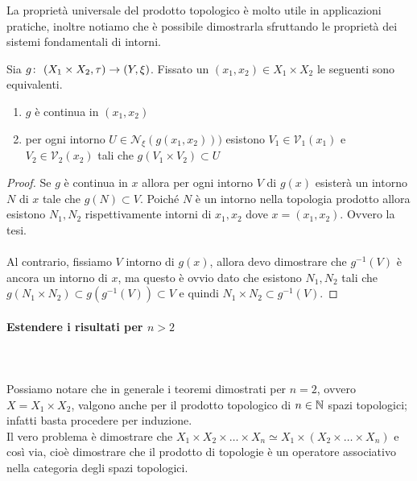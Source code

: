 La proprietà universale del prodotto topologico è molto utile in applicazioni pratiche, inoltre notiamo che è possibile dimostrarla sfruttando le proprietà dei sistemi fondamentali di intorni.
\begin{theorem}
	Sia $g \colon\ (X_1 \times X_2, \tau) \rightarrow (Y, \xi)$. Fissato un $(x_1, x_2) \in X_1 \times X_2$ le seguenti sono equivalenti.
	\begin{enumerate}
		\item $g$ è continua in $(x_1, x_2)$
		\item per ogni intorno $U \in \mathcal{N}_\xi(g(x_1,x_2)))$ esistono $V_1 \in \mathcal{V}_1(x_1)$ e $V_2 \in \mathcal{V}_2(x_2)$ tali che $g(V_1 \times V_2) \subset U$
	\end{enumerate}
\end{theorem}
\begin{proof}
	Se $g$ è continua in $x$ allora per ogni intorno $V$ di $g(x)$ esisterà un intorno $N$ di $x$ tale che $g(N) \subset V$. Poiché $N$ è un intorno nella topologia prodotto allora esistono $N_1, N_2$ rispettivamente intorni di $x_1, x_2$ dove $x = (x_1, x_2)$. Ovvero la tesi.\\ \\
	Al contrario, fissiamo $V$ intorno di $g(x)$, allora devo dimostrare che $g^{-1}(V)$ è ancora un intorno di $x$, ma questo è ovvio dato che esistono $N_1, N_2$ tali che $g(N_1 \times N_2) \subset g(g^{-1}(V)) \subset V$ e quindi $N_1 \times N_2 \subset g^{-1}(V)$. 
\end{proof}
\paragraph{Estendere i risultati per $n > 2$} \ \\ \\
Possiamo notare che in generale i teoremi dimostrati per $n=2$, ovvero $X=X_1 \times X_2$, valgono anche per il prodotto topologico di $n \in \mathbb{N}$ spazi topologici; infatti basta procedere per induzione. \\ Il vero problema è dimostrare che $X_1 \times X_2 \times \dots \times X_n \simeq X_1 \times (X_2 \times \dots \times X_n)$ e così via, cioè dimostrare che il prodotto di topologie è un operatore associativo nella categoria degli spazi topologici. 

